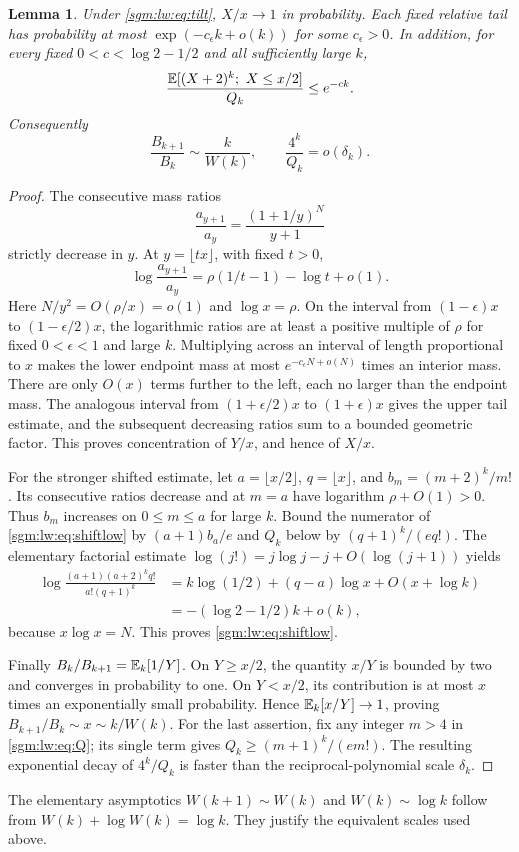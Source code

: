 \documentclass[11pt,letterpaper]{article}
\newtheorem{lemma}[theorem]{Lemma}\newtheorem{proposition}[theorem]{Proposition}\newtheorem{corollary}[theorem]{Corollary}
\theoremstyle{remark}\newtheorem{remark}[theorem]{Remark}
\theoremstyle{definition}\newtheorem{definition}[theorem]{Definition}
\begin{document}
\begin{lemma}\label{sgm:lw:lem:saddle}
Under \eqref{sgm:lw:eq:tilt}, $X/x\to1$ in probability. Each fixed relative tail has probability at most $\exp(-c_\epsilon k+o(k))$ for some $c_\epsilon>0$. In addition, for every fixed $0<c<\log2-1/2$ and all sufficiently large $k$,
\begin{equation}\label{sgm:lw:eq:shiftlow}
 \frac{\mathbb E[(X+2)^k;\ X\le x/2]}{Q_k}\le e^{-ck}.
\end{equation}
Consequently
\begin{equation}\label{sgm:lw:eq:Bellratio}
 \frac{B_{k+1}}{B_k}\sim\frac{k}{W(k)},
 \qquad \frac{4^k}{Q_k}=o(\delta_k).
\end{equation}
\end{lemma}
\begin{proof}
The consecutive mass ratios
\[
 \frac{a_{y+1}}{a_y}=\frac{(1+1/y)^N}{y+1}
\]
strictly decrease in $y$. At $y=\lfloor t x\rfloor$, with fixed $t>0$,
\[
 \log\frac{a_{y+1}}{a_y}
 =\rho(1/t-1)-\log t+o(1).
\]
Here $N/y^2=O(\rho/x)=o(1)$ and $\log x=\rho$. On the interval from $(1-\epsilon)x$ to $(1-\epsilon/2)x$, the logarithmic ratios are at least a positive multiple of $\rho$ for fixed $0<\epsilon<1$ and large $k$. Multiplying across an interval of length proportional to $x$ makes the lower endpoint mass at most $e^{-c_\epsilon N+o(N)}$ times an interior mass. There are only $O(x)$ terms further to the left, each no larger than the endpoint mass. The analogous interval from $(1+\epsilon/2)x$ to $(1+\epsilon)x$ gives the upper tail estimate, and the subsequent decreasing ratios sum to a bounded geometric factor. This proves concentration of $Y/x$, and hence of $X/x$.

For the stronger shifted estimate, let $a=\lfloor x/2\rfloor$, $q=\lfloor x\rfloor$, and $b_m=(m+2)^k/m!$. Its consecutive ratios decrease and at $m=a$ have logarithm $\rho+O(1)>0$. Thus $b_m$ increases on $0\le m\le a$ for large $k$. Bound the numerator of \eqref{sgm:lw:eq:shiftlow} by $(a+1)b_a/e$ and $Q_k$ below by $(q+1)^k/(e q!)$. The elementary factorial estimate $\log(j!)=j\log j-j+O(\log(j+1))$ yields
\begin{align*}
 \log\frac{(a+1)(a+2)^kq!}{a!(q+1)^k}
 &=k\log(1/2)+(q-a)\log x+O(x+\log k)\\
 &=-(\log2-1/2)k+o(k),
\end{align*}
because $x\log x=N$. This proves \eqref{sgm:lw:eq:shiftlow}.

Finally $B_k/B_{k+1}=\mathbb E_k[1/Y]$. On $Y\ge x/2$, the quantity $x/Y$ is bounded by two and converges in probability to one. On $Y<x/2$, its contribution is at most $x$ times an exponentially small probability. Hence $\mathbb E_k[x/Y]\to1$, proving $B_{k+1}/B_k\sim x\sim k/W(k)$. For the last assertion, fix any integer $m>4$ in \eqref{sgm:lw:eq:Q}; its single term gives $Q_k\ge(m+1)^k/(e m!)$. The resulting exponential decay of $4^k/Q_k$ is faster than the reciprocal-polynomial scale $\delta_k$.
\end{proof}
The elementary asymptotics $W(k+1)\sim W(k)$ and $W(k)\sim\log k$ follow from $W(k)+\log W(k)=\log k$. They justify the equivalent scales used above.
\end{document}
